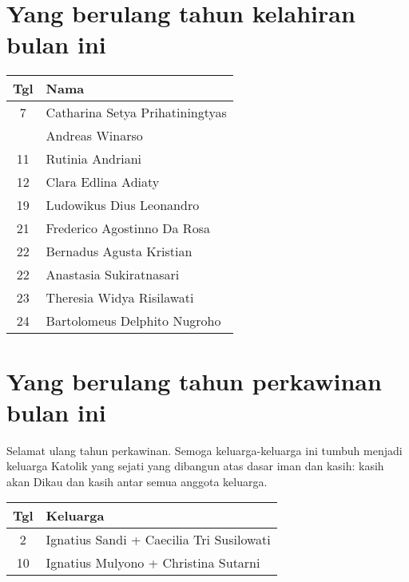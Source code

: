 

\section*{Yang berulang tahun kelahiran bulan ini}


\begin{longtable}{|c|l|} 
\hline
 Tgl & Nama \\ \hline
\endhead
7 & Catharina Setya Prihatiningtyas \\ 
 & Andreas Winarso \\ 
11 &  Rutinia Andriani \\ 
12 & Clara Edlina Adiaty \\  
19 & Ludowikus Dius Leonandro \\  
21 & Frederico Agostinno Da Rosa \\ 
22 & Bernadus Agusta Kristian \\ 
22 & Anastasia Sukiratnasari \\ 
23 & Theresia Widya Risilawati \\ 
24 & Bartolomeus Delphito Nugroho \\ \hline 
\end{longtable}
 
\section*{Yang berulang tahun perkawinan  bulan ini}

Selamat ulang tahun perkawinan. Semoga keluarga-keluarga ini tumbuh menjadi keluarga Katolik yang sejati yang dibangun atas dasar iman dan kasih: kasih akan Dikau dan kasih antar semua anggota keluarga.

\begin{longtable}{|c|l|} 
\hline Tgl & Keluarga \\ \hline
2 &Ignatius Sandi + Caecilia Tri Susilowati\\
10&Ignatius Mulyono + Christina Sutarni\\ \hline 
\end{longtable}

